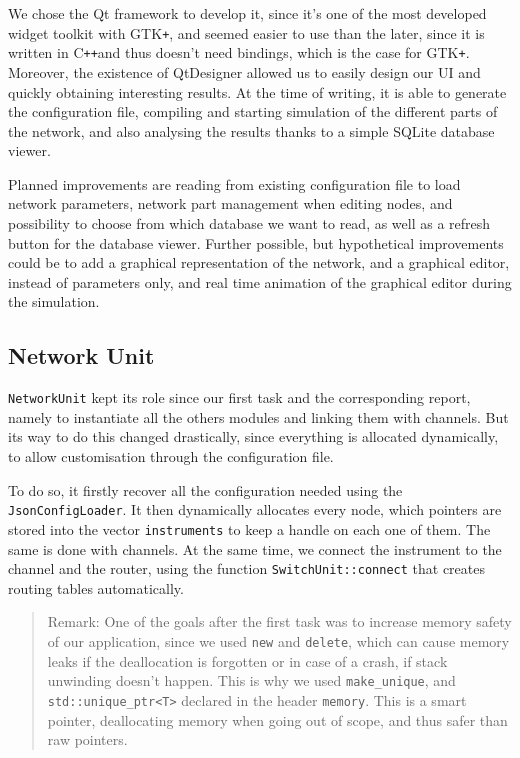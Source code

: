 \documentclass[12pt,a4paper]{article}
\newcommand{\Cpp}{C\texttt{++}}
\begin{document}
We chose the Qt framework to develop it, since it's one of the most developed widget toolkit with GTK\texttt{+}, and seemed easier to use than the later, since it is written in \Cpp and thus doesn't need bindings, which is the case for GTK\texttt{+}. Moreover, the existence of QtDesigner allowed us to easily design our UI and quickly obtaining interesting results. At the time of writing, it is able to generate the configuration file, compiling and starting simulation of the different parts of the network, and also analysing the results thanks to a simple SQLite database viewer.

Planned improvements are reading from existing configuration file to load network parameters, network part management when editing nodes, and possibility to choose from which database we want to read, as well as a refresh button for the database viewer.
Further possible, but hypothetical improvements could be to add a graphical representation of the network, and a graphical editor, instead of parameters only, and real time animation of the graphical editor during the simulation.

\subsection{Network Unit}
\texttt{NetworkUnit} kept its role since our first task and the corresponding report, namely to instantiate all the others modules and linking them with channels. But its way to do this changed drastically, since everything is allocated dynamically, to allow customisation through the configuration file.

To do so, it firstly recover all the configuration needed using the \texttt{JsonConfigLoader}. It then dynamically allocates every node, which pointers are stored into the vector \texttt{instruments} to keep a handle on each one of them. The same is done with channels. At the same time, we connect the instrument to the channel and the router, using the function \texttt{SwitchUnit::connect} that creates routing tables automatically. 
\begin{quote}
Remark: One of the goals after the first task was to increase memory safety of our application, since we used \texttt{new} and \texttt{delete}, which can cause memory leaks if the deallocation is forgotten or in case of a crash, if stack unwinding doesn't happen. This is why we used \texttt{make\_unique}, and \texttt{std::unique\_ptr<T>} declared in the header \texttt{memory}. This is a smart pointer, deallocating memory when going out of scope, and thus safer than raw pointers.
\end{quote}
\end{document}

